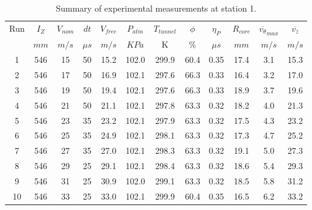 \begin{table}[H]
\begin{center}
\begin{tabular}{|cccccccccccc|}
	\hline
	Run & $I_Z$ & $V_{nom}$ & $dt$ & $V_{free}$ & $P_{atm}$ & $T_{tunnel}$ & $\phi$ & $\eta_P$ & $R_{core}$ & $\overline{v_{\theta}}_{max}$ & $\overline{v_{\bar{z}}}$\\
	  & $mm$ & $m/s$ & $\mu s$ & $m/s$ & $KPa$ & K & $\%$ & $\mu s$ & $mm$ & $m/s$ & $m/s$\\
	\hline
	1 & 546 & 15 & 50 & 15.2 & 102.0 & 299.9 & 60.4 & 0.35 & 17.4 & 3.1 & 15.3\\
	2 & 546 & 17 & 50 & 16.9 & 102.1 & 297.6 & 66.3 & 0.33 & 16.4 & 3.2 & 17.0\\
	3 & 546 & 19 & 50 & 19.4 & 102.1 & 297.6 & 66.3 & 0.33 & 18.9 & 3.7 & 19.6\\
	4 & 546 & 21 & 50 & 21.1 & 102.1 & 297.8 & 63.3 & 0.32 & 18.2 & 4.0 & 21.3\\
	5 & 546 & 23 & 35 & 23.2 & 102.1 & 297.9 & 63.3 & 0.32 & 17.5 & 4.3 & 23.2\\
	6 & 546 & 25 & 35 & 24.9 & 102.1 & 298.1 & 63.3 & 0.32 & 17.3 & 4.7 & 25.2\\
	7 & 546 & 27 & 35 & 27.0 & 102.1 & 298.3 & 63.3 & 0.32 & 19.1 & 5.0 & 27.3\\
	8 & 546 & 29 & 25 & 29.1 & 102.1 & 298.4 & 63.3 & 0.32 & 18.6 & 5.4 & 29.3\\
	9 & 546 & 31 & 25 & 30.9 & 102.0 & 299.1 & 63.3 & 0.32 & 18.5 & 5.8 & 31.2\\
	10 & 546 & 33 & 25 & 33.0 & 102.1 & 299.9 & 60.4 & 0.35 & 16.5 & 6.2 & 33.2\\
	\hline
\end{tabular}
\caption{Summary of experimental measurements at station 1.}
\label{table:experiment_results_1}
\end{center}
\end{table}
